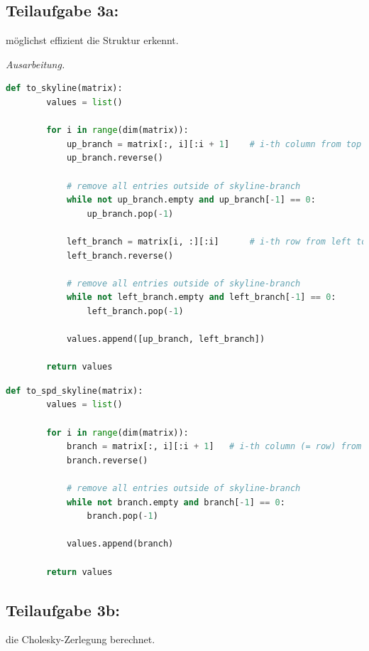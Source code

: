 \documentclass[]{article}
\newenvironment{ausarbeitung}{\vspace{3mm}\noindent\textit{Ausarbeitung.}}{}
\begin{document}
\subsection*{Teilaufgabe 3a:}
möglichst effizient die Struktur erkennt.

\begin{ausarbeitung}
	\begin{lstlisting}[language=Python, caption=Strukturerkennung einer nicht notwendigerweise symmetrischen Skyline-Matrix]
	def to_skyline(matrix):
		values = list()
	
		for i in range(dim(matrix)):
			up_branch = matrix[:, i][:i + 1]	# i-th column from top to diagonal
			up_branch.reverse()
 	    
			# remove all entries outside of skyline-branch
			while not up_branch.empty and up_branch[-1] == 0: 
				up_branch.pop(-1)
	
			left_branch = matrix[i, :][:i]		# i-th row from left to diagonal
			left_branch.reverse()
			
			# remove all entries outside of skyline-branch
			while not left_branch.empty and left_branch[-1] == 0:
				left_branch.pop(-1)
			
			values.append([up_branch, left_branch])
	
		return values
	\end{lstlisting}
	
	\begin{lstlisting}[language=Python, caption=Strukturerkennung einer symmetrischen positiv definiten Skyline-Matrix]
	def to_spd_skyline(matrix):
		values = list()
			
		for i in range(dim(matrix)):
			branch = matrix[:, i][:i + 1]	# i-th column (= row) from top to diagonal
			branch.reverse()
		
			# remove all entries outside of skyline-branch
			while not branch.empty and branch[-1] == 0:
				branch.pop(-1)
				
			values.append(branch)
			
		return values
	\end{lstlisting}
\end{ausarbeitung}


\subsection*{Teilaufgabe 3b:}
die Cholesky-Zerlegung berechnet.
\end{document}

